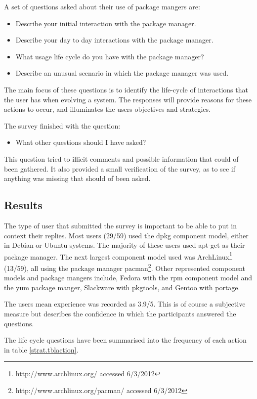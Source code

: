 A set of questions asked about their use of package mangers are:
\begin{itemize}
  \item Describe your initial interaction with the package manager.
  \item Describe your day to day interactions with the package manager.
  \item What usage life cycle do you have with the package manager?
  \item Describe an unusual scenario in which the package manager was used.
\end{itemize}
The main focus of these questions is to identify the life-cycle of interactions that the user has when evolving a system.
The responses will provide reasons for these actions to occur, and illuminates the users objectives and strategies.

The survey finished with the question:
\begin{itemize}
  \item What other questions should I have asked?
\end{itemize}
This question tried to illicit comments and possible information that could of been gathered.
It also provided a small verification of the survey, as to see if anything was missing that should of been asked.

\subsection{Results}
The type of user that submitted the survey is important to be able to put in context their replies.
Most users (29/59) used the dpkg component model, either in Debian or Ubuntu systems.
The majority of these users used apt-get as their package manager.
The next largest component model used was ArchLinux\footnote{http://www.archlinux.org/ accessed 6/3/2012} (13/59),
all using the package manager pacman\footnote{http://www.archlinux.org/pacman/ accessed 6/3/2012}.
Other represented component models and package mangers include, Fedora with the rpm component model and the yum package manger,
Slackware with pkgtools, and Gentoo with portage.

The users mean experience was recorded as 3.9/5.
This is of course a subjective measure but describes the confidence in which the participants answered the questions. 

The life cycle questions have been summarised into the frequency of each action in table \ref{strat.tblaction}.

